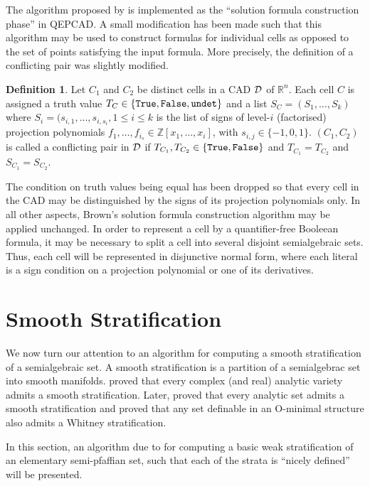 \documentclass[
]{book}
\theoremstyle{definition}
\newtheorem{definition}{Definition}[chapter]
\theoremstyle{definition}
\theoremstyle{definition}
\theoremstyle{definition}
\theoremstyle{remark}
\begin{document}
The algorithm proposed by \citet{brown99} is implemented as the ``solution formula construction phase'' in QEPCAD. A small modification has been made such that this algorithm may be used to construct formulas for individual cells as opposed to the set of points satisfying the input formula. More precisely, the definition of a conflicting pair was slightly modified.

\begin{definition}
Let \(C_1\) and \(C_2\) be distinct cells in a CAD \(\cal D\) of \(\mathbb{R}^n\). Each cell \(C\) is assigned a truth value \(T_C \in \{\tt{True}, \tt{False}, \tt{undet}\}\) and a list \(S_C = (S_1,\ldots,S_k)\) where \(S_i = (s_{i,1},\ldots,s_{i,s_i}, 1\le i \le k\) is the list of signs of level-\(i\) (factorised) projection polynomials \(f_1,\ldots,f_{i_s} \in \mathbb{Z}[x_1,\ldots,x_i]\), with \(s_{i,j} \in \{-1,0,1\}\).
\((C_1, C_2)\) is called a conflicting pair in \(\cal D\) if \(T_{C_1}, T_{C_2} \in \{\tt{True}, \tt{False}\}\) and \(T_{C_1} = T_{C_2}\) and \(S_{C_1} = S_{C_2}\).
\end{definition}

The condition on truth values being equal has been dropped so that every cell in the CAD may be distinguished by the signs of its projection polynomials only. In all other aspects, Brown's solution formula construction algorithm may be applied unchanged. In order to represent a cell by a quantifier-free Booleean formula, it may be necessary to split a cell into several disjoint semialgebraic sets. Thus, each cell will be represented in disjunctive normal form, where each literal is a sign condition on a projection polynomial or one of its derivatives.

\hypertarget{sec:smooth-strat}{%
\chapter{Smooth Stratification}\label{sec:smooth-strat}}

We now turn our attention to an algorithm for computing a smooth stratification of a semialgebraic set. A smooth stratification is a partition of a semialgebrac set into smooth manifolds. \citep{whitney1965} proved that every complex (and real) analytic variety admits a smooth stratification. Later, \citep{thom1969} proved that every analytic set admits a smooth stratification and \citep{le2010} proved that any set definable in an O-minimal structure also admits a Whitney stratification.

In this section, an algorithm due to \citep{gv1995} for computing a basic weak stratification of an elementary semi-pfaffian set, such that each of the strata is ``nicely defined'' will be presented.
\end{document}
